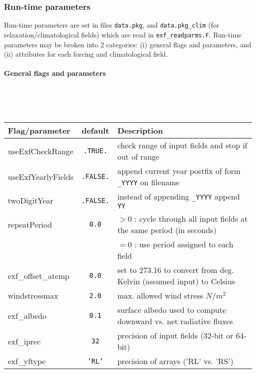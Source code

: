 
\subsubsection{Run-time parameters
\label{sec:pkg:exf:runtime}}

Run-time parameters are set in files \texttt{data.pkg},
and \texttt{data.pkg\_clim} (for relaxation/climatological fields)
which are read in \texttt{exf\_readparms.F}.
Run-time parameters may be broken into 2 categories:
(i) general flags and parameters, and
(ii) attributes for each forcing and climatological field.

\paragraph{General flags and parameters}

~

\begin{table}[h!]
  \label{tab:pkg:exf:runtime_flags}
  {\footnotesize
    \begin{tabular}{|l|c|l|}
      \hline 
      \textbf{Flag/parameter} & \textbf{default} &  \textbf{Description}  \\
      \hline \hline
        useExfCheckRange & \texttt{.TRUE.} & 
           check range of input fields and stop if out of range \\
        useExfYearlyFields & \texttt{.FALSE.} & 
           append current year postfix of form \texttt{\_YYYY} on filename \\
        twoDigitYear & \texttt{.FALSE.} & 
           instead of appending \texttt{\_YYYY} append  \texttt{YY} \\
        repeatPeriod & \texttt{0.0} & $ > 0 $ : 
           cycle through all input fields at the same period (in seconds) \\
        ~            & ~            & $ = 0 $ :
           use period assigned to each field \\
        exf\_offset\_atemp & \texttt{0.0} & set to 273.16 to convert from deg. Kelvin (assumed input) to Celsius \\
        windstressmax & \texttt{2.0} & 
           max. allowed wind stress $N/m^2$ \\
        exf\_albedo & \texttt{0.1} & 
          surface albedo used to compute downward vs. net radiative fluxes \\
        exf\_iprec  & \texttt{32} & 
          precision of input fields (32-bit or 64-bit) \\
        exf\_yftype & \texttt{'RL'} & 
          precision of arrays ('RL' vs. 'RS') \\
      \hline
    \end{tabular}
  }
  \caption{~}
\end{table}


